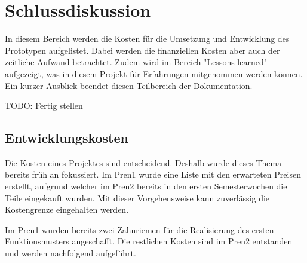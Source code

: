 \newpage
\section{Schlussdiskussion}

In diesem Bereich werden die Kosten für die Umsetzung und Entwicklung des Prototypen aufgelistet. Dabei werden die finanziellen Kosten aber auch der zeitliche Aufwand betrachtet. Zudem wird im Bereich "Lessons learned" aufgezeigt, was in diesem Projekt für Erfahrungen mitgenommen werden können. Ein kurzer Ausblick beendet diesen Teilbereich der Dokumentation.

TODO: Fertig stellen

\subsection{Entwicklungskosten}

Die Kosten eines Projektes sind entscheidend. Deshalb wurde dieses Thema bereits früh an fokussiert. Im Pren1 wurde eine Liste mit den erwarteten Preisen erstellt, aufgrund welcher im Pren2 bereits in den ersten Semesterwochen die Teile eingekauft wurden. Mit dieser Vorgehensweise kann zuverlässig die Kostengrenze eingehalten werden.

Im Pren1 wurden bereits zwei Zahnriemen für die Realisierung des ersten Funktionsmusters angeschafft. Die restlichen Kosten sind im Pren2 entstanden und werden nachfolgend aufgeführt.

